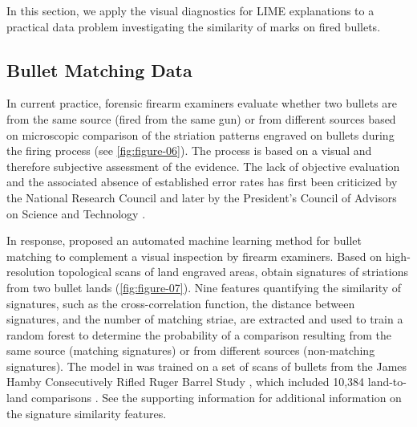 \documentclass[AMS,STIX2COL]{WileyNJD-v2}\usepackage[]{graphicx}\usepackage[]{color}
\begin{document}
In this section, we  apply the visual diagnostics for LIME explanations to a practical data problem investigating the similarity of marks on fired bullets.

\subsection{Bullet Matching Data}







In current practice, forensic firearm examiners evaluate whether two bullets are from the same source (fired from the same gun) or from different sources based on microscopic comparison of the striation patterns engraved on bullets during the firing process (see \autoref{fig:figure-06}). The process is based on a visual and therefore subjective assessment of the evidence. The lack of objective evaluation and the associated absence of established error rates has first been criticized by the National Research Council \cite{nrc:2009} and later by the President's Council of Advisors on Science and Technology \cite{pcast:2016}.

In response, \citet{hare:2017} proposed an automated machine learning method for bullet matching to complement a visual inspection by firearm examiners. Based on high-resolution topological scans of land engraved areas, \citet{hare:2017} obtain signatures of striations from two bullet lands (\autoref{fig:figure-07}). Nine features quantifying the similarity of signatures, such as the cross-correlation function, the distance between signatures, and the number of matching striae, are extracted and used to train a random forest to determine the probability of a comparison resulting from the same source (matching signatures) or from different sources (non-matching signatures). The model in \citet{hare:2017} was trained on a set of scans of bullets from the James Hamby Consecutively Rifled Ruger Barrel Study \citep{hamby:2009}, which included 10,384 land-to-land comparisons \citep{hare:2017}. See the supporting information for additional information on the signature similarity features.
\end{document}
